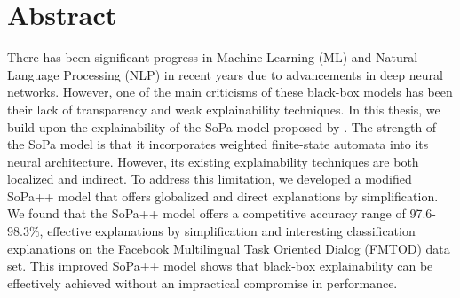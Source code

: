 \chapter{Abstract}

There has been significant progress in Machine Learning (ML) and Natural
Language Processing (NLP) in recent years due to advancements in deep neural
networks. However, one of the main criticisms of these black-box models has been
their lack of transparency and weak explainability techniques. In this
thesis, we build upon the explainability of the SoPa model proposed by
\citet{schwartz2018sopa}. The strength of the SoPa model is that it incorporates
weighted finite-state automata into its neural architecture. However, its
existing explainability techniques are both localized and indirect. To address
this limitation, we developed a modified SoPa++ model that offers globalized and
direct explanations by simplification. We found that the SoPa++ model offers a
competitive accuracy range of 97.6-98.3$\%$, effective explanations by
simplification and interesting classification explanations on the Facebook
Multilingual Task Oriented Dialog (FMTOD) data set. This improved SoPa++ model
shows that black-box explainability can be effectively achieved without an
impractical compromise in performance.


